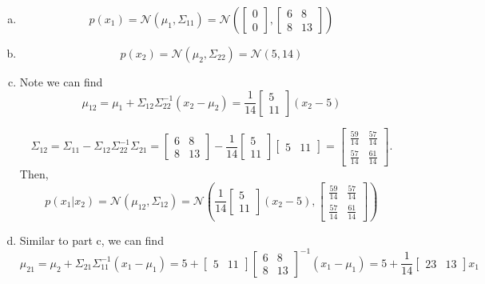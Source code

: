 \documentclass[12pt,letterpaper,fleqn]{hmcpset}
\begin{document}
\begin{solution}
\begin{enumerate}[(a)]
    \item $$p(x_1) = \mathcal{N}(\mu_{1}, \Sigma_{11}) = \mathcal{N} \left( \begin{bmatrix} 0 \\ 0 \end{bmatrix}, \begin{bmatrix} 6 & 8 \\ 8 & 13 \end{bmatrix} \right)$$
    \item $$p(x_2) = \mathcal{N}(\mu_2, \Sigma_{22}) = \mathcal{N}(5, 14)$$

    \item Note we can find $$\mu_{12} = \mu_1 + \Sigma_{12}\Sigma_{22}^{-1}(x_2 - \mu_2) = \frac{1}{14} \begin{bmatrix} 5 \\ 11 \end{bmatrix} (x_2 - 5)$$

$$\Sigma_{12} = \Sigma_{11} - \Sigma_{12}\Sigma_{22}^{-1}\Sigma_{21} = \begin{bmatrix} 6 & 8 \\ 8 & 13 \end{bmatrix} - \frac{1}{14} \begin{bmatrix} 5 \\ 11 \end{bmatrix} \begin{bmatrix} 5 & 11 \end{bmatrix} = \begin{bmatrix} \frac{59}{14} & \frac{57}{14} \\ \frac{57}{14} & \frac{61}{14} \end{bmatrix}.$$
Then, $$p(x_1|x_2) = \mathcal{N} (\mu_{12}, \Sigma_{12})
 = \mathcal{N}\left(\frac{1}{14} \begin{bmatrix} 5 \\ 11 \end{bmatrix} (x_2 - 5),  \begin{bmatrix} \frac{59}{14} & \frac{57}{14} \\ \frac{57}{14} & \frac{61}{14} \end{bmatrix}\right)$$
 
	\item Similar to part c, we can find $$\mu_{21} = \mu_2 + \Sigma_{21}\Sigma_{11}^{-1}(x_1 - \mu_1) = 5 + \begin{bmatrix} 5 & 11 \end{bmatrix} \begin{bmatrix} 6 & 8 \\ 8 & 13 \end{bmatrix}^{-1} (x_1 - \mu_1) = 5 + \frac{1}{14} \begin{bmatrix} 23 & 13 \end{bmatrix} x_1$$


\end{enumerate}
\end{solution}
\end{document}
